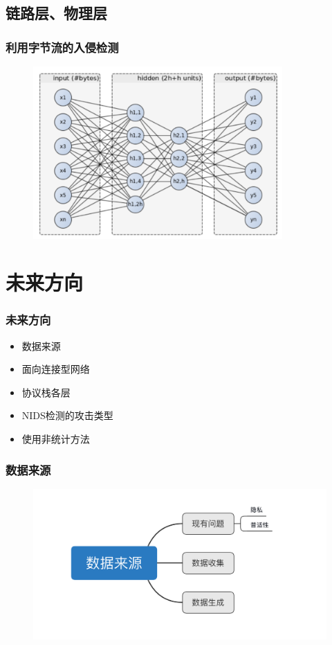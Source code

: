\documentclass[12pt]{ctexbeamer}
\begin{document}
\subsection{链路层、物理层}
\begin{frame}
  \frametitle{利用字节流的入侵检测}
  \begin{figure}
    \includegraphics[width=0.85\textwidth]{figures/autoencoder.PNG}
  	\end{figure}

\end{frame}



\section{未来方向}

\begin{frame}
  \frametitle{未来方向}
    \begin{itemize}
      \item 数据来源
      \item 面向连接型网络
      \item 协议栈各层
      \item NIDS检测的攻击类型
      \item 使用非统计方法
    \end{itemize}
\end{frame}

\begin{frame}
  \frametitle{数据来源}
  \begin{figure}
    \includegraphics[width=1.0\textwidth]{figures/数据来源.jpg}
  	\end{figure}

\end{frame}
\end{document}
